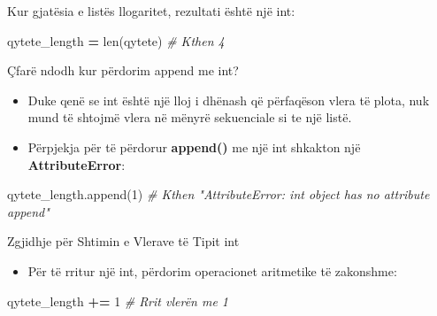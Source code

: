 \documentclass[
  ignorenonframetext,
]{beamer}
\newenvironment{Shaded}{\begin{snugshade}}{\end{snugshade}}
\newcommand{\BuiltInTok}[1]{#1}
\newcommand{\CommentTok}[1]{\textcolor[rgb]{0.56,0.35,0.01}{\textit{#1}}}
\newcommand{\DecValTok}[1]{\textcolor[rgb]{0.00,0.00,0.81}{#1}}
\newcommand{\NormalTok}[1]{#1}
\newcommand{\OperatorTok}[1]{\textcolor[rgb]{0.81,0.36,0.00}{\textbf{#1}}}
\providecommand{\tightlist}{%
  \setlength{\itemsep}{0pt}\setlength{\parskip}{0pt}}
\begin{document}
\begin{frame}[fragile]{Kur gjatësia e listës llogaritet, rezultati është
një int:}
\protect\hypertarget{kur-gjatuxebsia-e-listuxebs-llogaritet-rezultati-uxebshtuxeb-njuxeb-int}{}
\begin{Shaded}
\begin{Highlighting}[]
\NormalTok{qytete\_length }\OperatorTok{=} \BuiltInTok{len}\NormalTok{(qytete)  }\CommentTok{\# Kthen 4}
\end{Highlighting}
\end{Shaded}
\end{frame}

\begin{frame}[fragile]{Çfarë ndodh kur përdorim append me int?}
\protect\hypertarget{uxe7faruxeb-ndodh-kur-puxebrdorim-append-me-int}{}
\begin{itemize}
\item
  Duke qenë se int është një lloj i dhënash që përfaqëson vlera të
  plota, nuk mund të shtojmë vlera në mënyrë sekuenciale si te një
  listë.
\item
  Përpjekja për të përdorur \textbf{append()} me një int shkakton një
  \textbf{AttributeError}:
\end{itemize}

\begin{Shaded}
\begin{Highlighting}[]
\NormalTok{qytete\_length.append(}\DecValTok{1}\NormalTok{)  }\CommentTok{\# Kthen "AttributeError: \textquotesingle{}int\textquotesingle{} object has no attribute \textquotesingle{}append\textquotesingle{}"}
\end{Highlighting}
\end{Shaded}
\end{frame}

\begin{frame}[fragile]{Zgjidhje për Shtimin e Vlerave të Tipit int}
\protect\hypertarget{zgjidhje-puxebr-shtimin-e-vlerave-tuxeb-tipit-int}{}
\begin{itemize}
\tightlist
\item
  Për të rritur një int, përdorim operacionet aritmetike të zakonshme:
\end{itemize}

\begin{Shaded}
\begin{Highlighting}[]
\NormalTok{qytete\_length }\OperatorTok{+=} \DecValTok{1}  \CommentTok{\# Rrit vlerën me 1}
\end{Highlighting}
\end{Shaded}
\end{frame}
\end{document}
